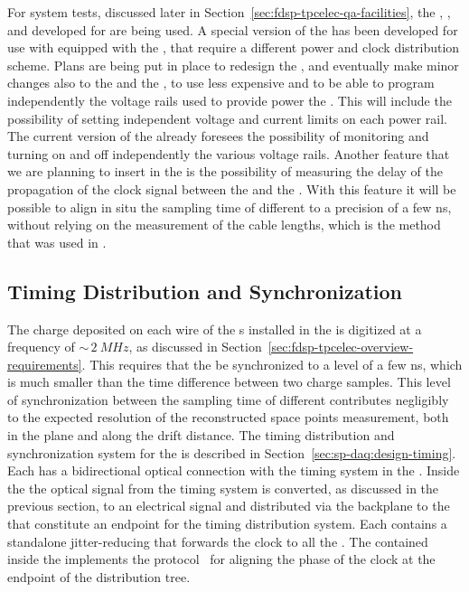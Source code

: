 For system tests, discussed later in Section~\ref{sec:fdsp-tpcelec-qa-facilities},
the , , and  developed for 
are being used. A special version of the  has been developed
for use with  equipped with the  ,
that require a different power and clock distribution scheme. Plans are
being put in place to redesign the , and eventually make 
minor changes also to the  and the , to use 
less expensive  and to be able to program independently
the voltage rails used to provide power the . This will include
the possibility of setting independent voltage and current limits on each power
rail. The current  version of the  already foresees
the possibility of monitoring and turning on and off independently the
various voltage rails. Another feature that we are planning to insert in
the  is the possibility of measuring the delay of the propagation
of the clock signal between the  and the . With
this feature it will be possible to align in situ the sampling time of different
 to a precision of a few ns, without relying on the 
measurement of the cable lengths, which is the method that was used
in .


\subsection{Timing Distribution and Synchronization}
\label{sec:fdsp-tpcelec-design-timing}

The charge deposited on each wire of the s installed 
in the   is digitized at a frequency of
$\sim\,\SI{2}{MHz}$, as discussed in 
Section~\ref{sec:fdsp-tpcelec-overview-requirements}. This requires
that the  be synchronized to a level of a few ns, which is
much smaller than the time difference between two charge samples.
This level of synchronization between the sampling time of different
 contributes negligibly %
to the expected
resolution %
of the reconstructed space points measurement,
both in the  plane and along the drift distance.
The timing distribution and synchronization system for the %
 is described in Section~\ref{sec:sp-daq:design-timing}.
Each  has a bidirectional optical connection with the
timing system in the . Inside the  the optical
signal from the timing system is converted, as discussed in the previous
section, to an electrical signal and distributed via the backplane to
the  that constitute an endpoint for the timing distribution
system. Each  contains a standalone jitter-reducing  
that %
forwards the clock to all the . The
 contained inside the  implements the 
protocol~\cite{bib:docdb1651,bib:docdb11233}%
for aligning
the phase of the clock at the endpoint of the distribution tree.

